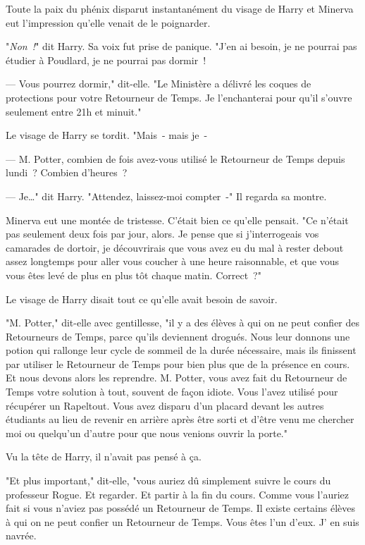Toute la paix du phénix disparut instantanément du visage de Harry et Minerva eut l'impression qu'elle venait de le poignarder.

"\emph{Non~!}" dit Harry. Sa voix fut prise de panique. "J'en ai besoin, je ne pourrai pas étudier à Poudlard, je ne pourrai pas dormir~!

--- Vous pourrez dormir," dit-elle. "Le Ministère a délivré les coques de protections pour votre Retourneur de Temps. Je l'enchanterai pour qu'il s'ouvre seulement entre 21h et minuit."

Le visage de Harry se tordit. "Mais~- mais je~-

--- M. Potter, combien de fois avez-vous utilisé le Retourneur de Temps depuis lundi~? Combien d'heures~?

--- Je…" dit Harry. "Attendez, laissez-moi compter~-" Il regarda sa montre.

Minerva eut une montée de tristesse. C'était bien ce qu'elle pensait. "Ce n'était pas seulement deux fois par jour, alors. Je pense que si j'interrogeais vos camarades de dortoir, je découvrirais que vous avez eu du mal à rester debout assez longtemps pour aller vous coucher à une heure raisonnable, et que vous vous êtes levé de plus en plus tôt chaque matin. Correct~?"

Le visage de Harry disait tout ce qu'elle avait besoin de savoir.

"M. Potter," dit-elle avec gentillesse, "il y a des élèves à qui on ne peut confier des Retourneurs de Temps, parce qu'ils deviennent drogués. Nous leur donnons une potion qui rallonge leur cycle de sommeil de la durée nécessaire, mais ils finissent par utiliser le Retourneur de Temps pour bien plus que de la présence en cours. Et nous devons alors les reprendre. M. Potter, vous avez fait du Retourneur de Temps votre solution à tout, souvent de façon idiote. Vous l'avez utilisé pour récupérer un Rapeltout. Vous avez disparu d'un placard devant les autres étudiants au lieu de revenir en arrière après être sorti et d'être venu me chercher moi ou quelqu'un d'autre pour que nous venions ouvrir la porte."

Vu la tête de Harry, il n'avait pas pensé à ça.

"Et plus important," dit-elle, "vous auriez dû simplement suivre le cours du professeur Rogue. Et regarder. Et partir à la fin du cours. Comme vous l'auriez fait si vous n'aviez pas possédé un Retourneur de Temps. Il existe certains élèves à qui on ne peut confier un Retourneur de Temps. Vous êtes l'un d'eux. J' en suis navrée.

